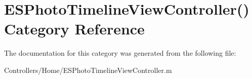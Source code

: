 \hypertarget{category_e_s_photo_timeline_view_controller_07_08}{}\section{E\+S\+Photo\+Timeline\+View\+Controller() Category Reference}
\label{category_e_s_photo_timeline_view_controller_07_08}


The documentation for this category was generated from the following file\+:\begin{DoxyCompactItemize}
\item 
Controllers/\+Home/E\+S\+Photo\+Timeline\+View\+Controller.\+m\end{DoxyCompactItemize}
